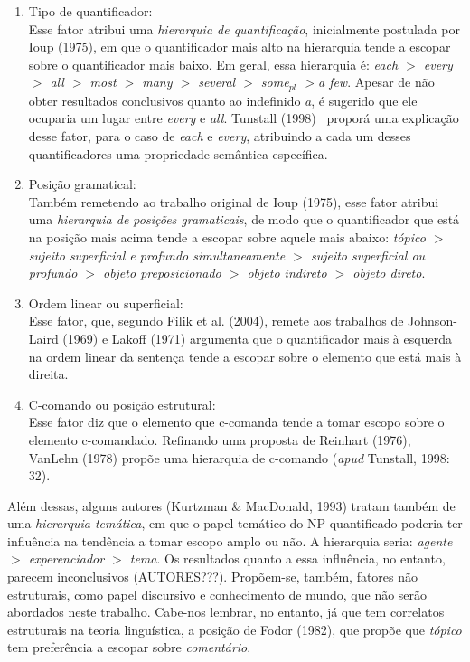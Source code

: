 \begin{enumerate}
    \item Tipo de quantificador:\\
    Esse fator atribui uma \emph{hierarquia de quantificação}, inicialmente postulada por Ioup (1975), em que o quantificador mais alto na hierarquia tende a escopar sobre o quantificador mais baixo. Em geral, essa hierarquia é: \emph{each $>$ every $>$ all $>$ most $>$ many $>$ several $>$ some$_{pl}$ $>$a few}. Apesar de não obter resultados conclusivos quanto ao indefinido \emph{a}, é sugerido que ele ocuparia um lugar entre \emph{every} e \emph{all}. Tunstall (1998)~\cite{Tunstall1998} proporá uma explicação desse fator, para o caso de \emph{each} e \emph{every}, atribuindo a cada um desses quantificadores uma propriedade semântica específica.
    \item Posição gramatical:\\
    Também remetendo ao trabalho original de Ioup (1975), esse fator atribui uma \emph{hierarquia de posições gramaticais}, de modo que o quantificador que está na posição mais acima tende a escopar sobre aquele mais abaixo: \emph{tópico $>$ sujeito superficial e profundo simultaneamente $>$ sujeito superficial ou profundo $>$ objeto preposicionado $>$ objeto indireto $>$ objeto direto}.
    \item Ordem linear ou superficial: \\
    Esse fator, que, segundo Filik et al. (2004), remete aos trabalhos de Johnson-Laird (1969) e Lakoff (1971) argumenta que o quantificador mais à esquerda na ordem linear da sentença tende a escopar sobre o elemento que está mais à direita.
    \item C-comando ou posição estrutural: \\
    Esse fator diz que o elemento que c-comanda tende a tomar escopo sobre o elemento c-comandado. Refinando uma proposta de Reinhart (1976), VanLehn (1978) propõe uma hierarquia de c-comando (\emph{apud} Tunstall, 1998: 32).
\end{enumerate}

Além dessas, alguns autores (Kurtzman \& MacDonald, 1993) tratam também de uma \emph{hierarquia temática}, em que o papel temático do NP quantificado poderia ter influência na tendência a tomar escopo amplo ou não. A hierarquia seria: \emph{agente $>$ experenciador $>$ tema}. Os resultados quanto a essa influência, no entanto, parecem inconclusivos (AUTORES???). Propõem-se, também, fatores não estruturais, como papel discursivo e conhecimento de mundo, que não serão abordados neste trabalho. Cabe-nos lembrar, no entanto, já que tem correlatos estruturais na teoria linguística, a posição de Fodor (1982), que propõe que \emph{tópico} tem preferência a escopar sobre \emph{comentário}.

